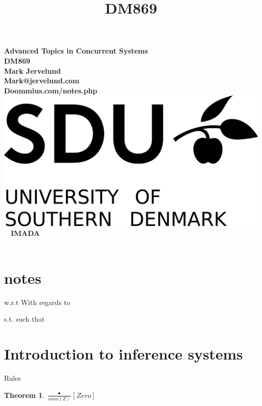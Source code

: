 \documentclass[a4paper,10pt,titlepage]{report}
\date{}
\title{DM869}
\newtheorem{theorem}{Theorem}
\begin{document}
\begin{titlepage}
\centering
    \vspace*{9\baselineskip}
    \huge
    \bfseries
     Advanced Topics in Concurrent Systems \\ DM869 \\
    \normalfont 
    Mark Jervelund  \\
    Mark@jervelund.com\\
    Doommius.com/notes.php 	\\
    \vspace*{9\baselineskip}
    \normalfont
	\includegraphics[scale=1]{SDU_logo}
    \vfill\ 
    \vspace{5mm}
    IMADA \\

    \textbf{\datedate} \\[2\baselineskip]
\end{titlepage}

\renewcommand{\thepage}{\roman{page}}%
\tableofcontents
\newpage
\setcounter{page}{1}
\renewcommand{\thepage}{\arabic{page}}

\section{notes}

w.r.t With regards to

s.t. such that
\section{Introduction to inference systems}

Rules

\begin{theorem}

$\frac{•}{num(Z)}[Zero]$

\end{theorem}
\end{document}

